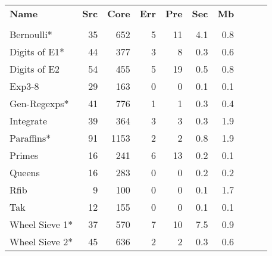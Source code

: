 \documentclass[preprint]{sigplanconf}
\begin{document}
\begin{table}
\begin{tabular*}{\linewidth}{lrrrrrrlll}
\hspace{-2mm} \textbf{Name} & \textbf{Src} & \textbf{Core} & \textbf{Err} & \textbf{Pre} & \textbf{Sec} & \textbf{Mb} \\
\vspace{-1ex} \\
\hspace{-2mm} Bernoulli*                   & 35 &  652 & 5 & 11 & 4.1 & 0.8 \\
\hspace{-2mm} Digits of E1*  \hspace{-3mm} & 44 &  377 & 3 &  8 & 0.3 & 0.6 \\
\hspace{-2mm} Digits of E2   \hspace{-3mm} & 54 &  455 & 5 & 19 & 0.5 & 0.8 \\
\hspace{-2mm} Exp3-8                       & 29 &  163 & 0 &  0 & 0.1 & 0.1 \\
\hspace{-2mm} Gen-Regexps*   \hspace{-3mm} & 41 &  776 & 1 &  1 & 0.3 & 0.4 \\
\hspace{-2mm} Integrate                    & 39 &  364 & 3 &  3 & 0.3 & 1.9 \\
\hspace{-2mm} Paraffins*                   & 91 & 1153 & 2 &  2 & 0.8 & 1.9 \\
\hspace{-2mm} Primes                       & 16 &  241 & 6 & 13 & 0.2 & 0.1 \\
\hspace{-2mm} Queens                       & 16 &  283 & 0 &  0 & 0.2 & 0.2 \\
\hspace{-2mm} Rfib                         &  9 &  100 & 0 &  0 & 0.1 & 1.7 \\
\hspace{-2mm} Tak                          & 12 &  155 & 0 &  0 & 0.1 & 0.1 \\
\hspace{-2mm} Wheel Sieve 1* \hspace{-3mm} & 37 &  570 & 7 & 10 & 7.5 & 0.9 \\
\hspace{-2mm} Wheel Sieve 2* \hspace{-3mm} & 45 &  636 & 2 &  2 & 0.3 & 0.6 \\

\end{tabular*}
\end{table}
\end{document}

